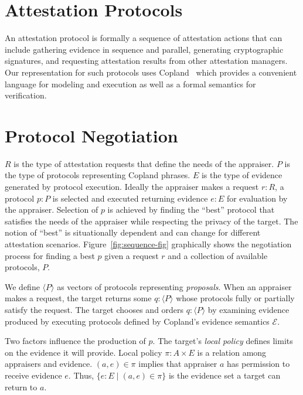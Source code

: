 \documentclass[sigconf,authordraft]{acmart}
\begin{document}
\section{Attestation Protocols}

An attestation protocol is formally a sequence of attestation actions
that can include gathering evidence in sequence and parallel,
generating cryptographic signatures, and requesting attestation
results from other attestation managers.  Our representation for such
protocols uses Copland~\citep{Ramsdell:2019aa} which provides a
convenient language for modeling and execution as well as a formal
semantics for verification.


\section{Protocol Negotiation}

$R$ is the type of attestation requests that define the needs of the
appraiser.  $P$ is the type of protocols representing Copland phrases.
$E$ is the type of evidence generated by protocol execution.  Ideally
the appraiser makes a request $r:R$, a protocol $p:P$ is selected and
executed returning evidence $e:E$ for evaluation by the appraiser.
Selection of $p$ is achieved by finding the ``best'' protocol that
satisfies the needs of the appraiser while respecting the privacy of
the target. The notion of ``best'' is situationally dependent and
can change for different attestation scenarios.
Figure~\ref{fig:sequence-fig} graphically shows the
negotiation process for finding a best $p$ given a request $r$ and a
collection of available protocols, $P$.

We define $\langle P \rangle$ as vectors of protocols
representing \emph{proposals}.  When an appraiser makes a request,
the target returns some $q:\langle P \rangle$ whose protocols fully or
partially satisfy the request. The target chooses and orders
$q:\langle P\rangle$ by examining evidence produced by executing
protocols defined by Copland's evidence semantics $\mathcal{E}$.

Two factors influence the production of $p$.  The target's \emph{local
policy} defines limits on the evidence it will provide.  Local policy 
$\pi : A\times E$ is a relation among appraisers and evidence.
$(a,e)\in\pi$ implies that appraiser $a$ has permission to receive
evidence $e$.  Thus, $\{e:E\mid (a,e)\in\pi\}$ is the evidence set a target
can return to $a$.
\end{document}
